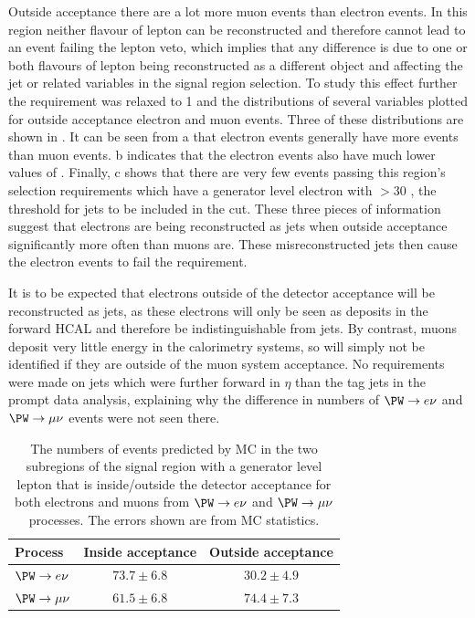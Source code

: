 Outside acceptance there are a lot more muon events than electron events. In this region neither flavour of lepton can be reconstructed and therefore cannot lead to an event failing the lepton veto, which implies that any difference is due to one or both flavours of lepton being reconstructed as a different object and affecting the jet or \MET related variables in the signal region selection. To study this effect further the \jetmetdphi requirement was relaxed to 1 and the distributions of several variables plotted for outside acceptance electron and muon events. Three of these distributions are shown in . It can be seen from a that electron events generally have more events than muon events. b indicates that the electron events also have much lower values of \jetmetdphi. Finally, c shows that there are very few events passing this region's selection requirements which have a generator level electron with \pt$>30$ \GeV, the threshold for jets to be included in the \jetmetdphi cut. These three pieces of information suggest that electrons are being reconstructed as jets when outside acceptance significantly more often than muons are. These misreconstructed jets then cause the electron events to fail the \jetmetdphi requirement.

It is to be expected that electrons outside of the detector acceptance will be reconstructed as jets, as these electrons will only be seen as deposits in the forward \ac{HCAL} and therefore be indistinguishable from jets. By contrast, muons deposit very little energy in the calorimetry systems, so will simply not be identified if they are outside of the muon system acceptance. No requirements were made on jets which were further forward in $\eta$ than the tag jets in the prompt data analysis, explaining why the difference in numbers of $\PW\rightarrow e\nu$ and $\PW\rightarrow\mu\nu$ events were not seen there.

\begin{table}
  \caption{The numbers of events predicted by \ac{MC} in the two subregions of the signal region with a generator level lepton that is inside/outside the detector acceptance for both electrons and muons from $\PW\rightarrow e\nu$ and $\PW\rightarrow\mu\nu$ processes. The errors shown are from \ac{MC} statistics.}
  \label{tab:enumunudiff}
  \begin{tabular}{lcc}
    \hline
    \hline
    Process & Inside acceptance & Outside acceptance \\
    \hline
    $\PW\rightarrow e\nu$ & $73.7\pm 6.8$ & $30.2\pm 4.9$ \\
    $\PW\rightarrow \mu\nu$ & $61.5\pm 6.8$ & $74.4\pm7.3$ \\
    \hline
    \hline
  \end{tabular}
\end{table}

